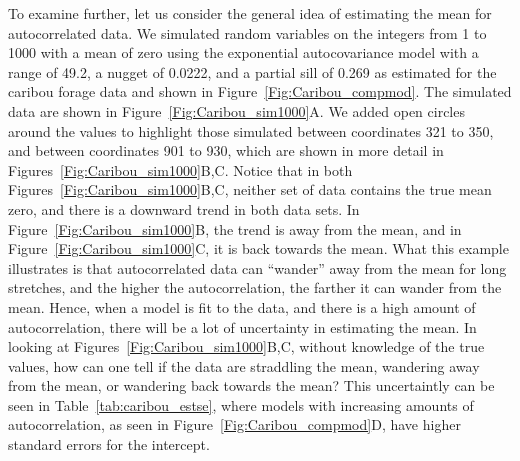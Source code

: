 \documentclass[12pt, titlepage]{article}
\begin{document}
To examine further, let us consider the general idea of estimating the mean for autocorrelated data.  We simulated random variables on the integers from 1 to 1000 with a mean of zero using the exponential autocovariance model with a range of 49.2, a nugget of 0.0222, and a partial sill of 0.269 as estimated for the caribou forage data and shown in Figure~\ref{Fig:Caribou_compmod}. The simulated data are shown in Figure~\ref{Fig:Caribou_sim1000}A.  We added open circles around the values to highlight those simulated between coordinates 321 to 350, and between coordinates 901 to 930, which are shown in more detail in Figures~\ref{Fig:Caribou_sim1000}B,C. Notice that in both Figures~\ref{Fig:Caribou_sim1000}B,C, neither set of data contains the true mean zero, and there is a downward trend in both data sets.  In Figure~\ref{Fig:Caribou_sim1000}B, the trend is away from the mean, and in Figure~\ref{Fig:Caribou_sim1000}C, it is back towards the mean.  What this example illustrates is that autocorrelated data can ``wander'' away from the mean for long stretches, and the higher the autocorrelation, the farther it can wander from the mean.  Hence, when a model is fit to the data, and there is a high amount of autocorrelation, there will be a lot of uncertainty in estimating the mean.  In looking at Figures~\ref{Fig:Caribou_sim1000}B,C, without knowledge of the true values, how can one tell if the data are straddling the mean, wandering away from the mean, or wandering back towards the mean?  This uncertaintly can be seen in Table~\ref{tab:caribou_estse}, where models with increasing amounts of autocorrelation, as seen in Figure~\ref{Fig:Caribou_compmod}D, have higher standard errors for the intercept. 
\end{document}

